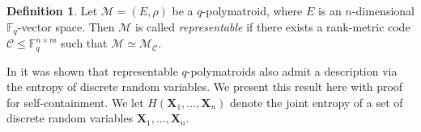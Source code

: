 \documentclass[onecolumn,draftclsnofoot,12pt]{IEEEtran}
\theoremstyle{plain} %
\theoremstyle{definition}
\newtheorem{definition}[theorem]{Definition}
\begin{document}
\begin{definition}
    Let $\mathcal{M} = (E, \rho)$ be a $q$-polymatroid, where $E$ is an $n$-dimensional $\mathbb{F}_q$-vector space. Then $\mathcal{M}$ is called \emph{representable} if there exists a rank-metric code $\mathcal{C} \leq \mathbb{F}_q^{n \times m}$ such that $\mathcal{M} \simeq \mathcal{M}_{\mathcal{C}}$.
\end{definition}

In \cite{dinesen2025secretsharingrankmetric} it was shown that representable $q$-polymatroids also admit a description via the entropy of discrete random variables. We present this result here with proof for self-containment. We let $H(\mathbf{X}_1,\ldots,\mathbf{X}_n)$ denote the joint entropy of a set of discrete random variables $\mathbf{X}_1,\ldots,\mathbf{X}_n$.
\end{document}
